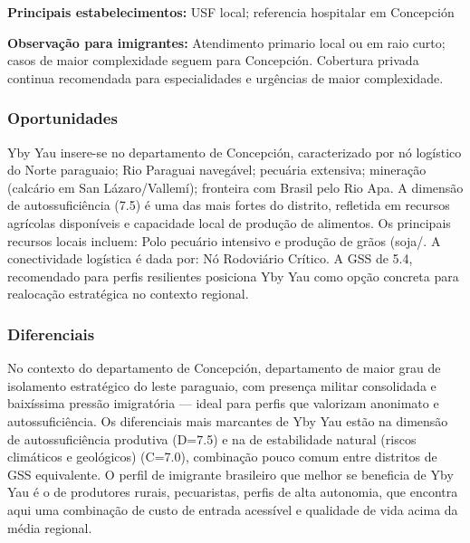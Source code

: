 \textbf{Principais estabelecimentos:} USF local; referencia hospitalar
em Concepción

\textbf{Observação para imigrantes:} Atendimento primario local ou em
raio curto; casos de maior complexidade seguem para Concepción.
Cobertura privada continua recomendada para especialidades e urgências
de maior complexidade.

\subsubsection*{Oportunidades}\label{oport-yby-yau-0107}
Yby Yau insere-se no departamento de Concepción, caracterizado por nó logístico do Norte paraguaio; Rio Paraguai navegável; pecuária extensiva; mineração (calcário em San Lázaro/Vallemí); fronteira com Brasil pelo Rio Apa. A dimensão de autossuficiência (7.5) é uma das mais fortes do distrito, refletida em recursos agrícolas disponíveis e capacidade local de produção de alimentos. Os principais recursos locais incluem: Polo pecuário intensivo e produção de grãos (soja/. A conectividade logística é dada por: Nó Rodoviário Crítico. A GSS de 5.4, recomendado para perfis resilientes posiciona Yby Yau como opção concreta para realocação estratégica no contexto regional.

\subsubsection*{Diferenciais}\label{dif-yby-yau-0107}
No contexto do departamento de Concepción, departamento de maior grau de isolamento estratégico do leste paraguaio, com presença militar consolidada e baixíssima pressão imigratória — ideal para perfis que valorizam anonimato e autossuficiência. Os diferenciais mais marcantes de Yby Yau estão na dimensão de autossuficiência produtiva (D=7.5) e na de estabilidade natural (riscos climáticos e geológicos) (C=7.0), combinação pouco comum entre distritos de GSS equivalente. O perfil de imigrante brasileiro que melhor se beneficia de Yby Yau é o de produtores rurais, pecuaristas, perfis de alta autonomia, que encontra aqui uma combinação de custo de entrada acessível e qualidade de vida acima da média regional.
